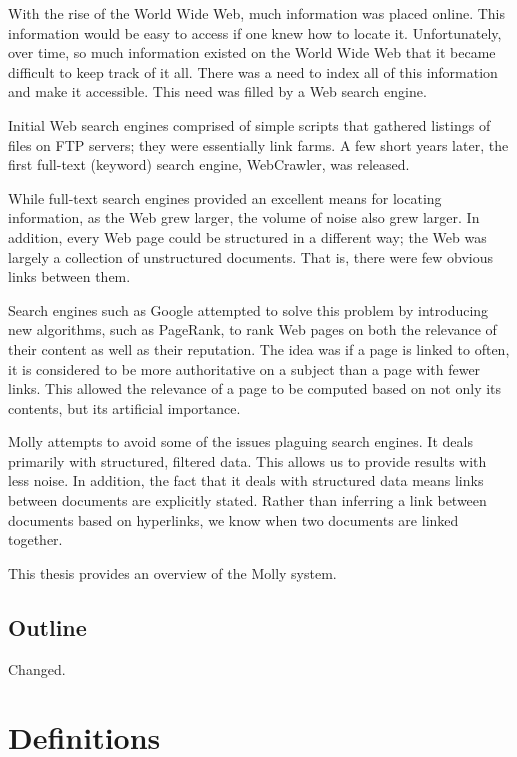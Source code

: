 \documentclass[12pt,letterpaper,oneside,notitlepage]{report}
\theoremstyle{definition}
\begin{document}
			With the rise of the World Wide Web, much information was placed online.  This information would be easy to access if one knew how to locate it.  Unfortunately, over time, so much information existed on the World Wide Web that it became difficult to keep track of it all.  There was a need to index all of this information and make it accessible.  This need was filled by a Web search engine.
		
			Initial Web search engines comprised of simple scripts that gathered listings of files on FTP servers; they were essentially link farms.  A few short years later, the first full-text (keyword) search engine, WebCrawler, was released.
		
			While full-text search engines provided an excellent means for locating information, as the Web grew larger, the volume of noise also grew larger.  In addition, every Web page could be structured in a different way; the Web was largely a collection of unstructured documents.  That is, there were few obvious links between them.
		
			Search engines such as Google attempted to solve this problem by introducing new algorithms, such as PageRank, to rank Web pages on both the relevance of their content as well as their reputation.  The idea was if a page is linked to often, it is considered to be more authoritative on a subject than a page with fewer links.  This allowed the relevance of a page to be computed based on not only its contents, but its artificial importance.
		
			Molly attempts to avoid some of the issues plaguing search engines.  It deals primarily with structured, filtered data.  This allows us to provide results with less noise.  In addition, the fact that it deals with structured data means links between documents are explicitly stated.  Rather than inferring a link between documents based on hyperlinks, we know when two documents are linked together.
		
			This thesis provides an overview of the Molly system.
		
		\section*{Outline}
			Changed.

	\tableofcontents

	\listoftables
	\listoffigures
	\listofalgorithms

	\clearpage
	
	\chapter{Definitions}
\end{document}
